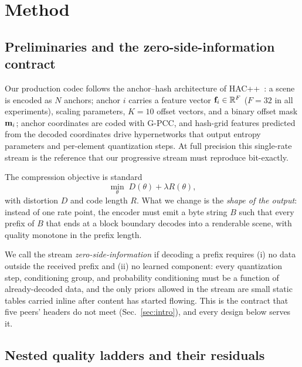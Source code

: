 \section{Method}
\label{sec:method}

\subsection{Preliminaries and the zero-side-information contract}
\label{sec:prelim}

Our production codec follows the anchor--hash architecture of HAC++~\cite{chen2025}: a scene is encoded as $N$ anchors; anchor $i$ carries a feature vector $\mathbf{f}_i\in\mathbb{R}^{F}$ ($F{=}32$ in all experiments), scaling parameters, $K{=}10$ offset vectors, and a binary offset mask $\mathbf{m}_i$; anchor coordinates are coded with G-PCC, and hash-grid features predicted from the decoded coordinates drive hypernetworks that output entropy parameters and per-element quantization steps.
At full precision this single-rate stream is the reference that our progressive stream must reproduce bit-exactly.

The compression objective is standard
\begin{equation}
\min_{\theta}\; D(\theta) + \lambda R(\theta),
\label{eq:rd}
\end{equation}
with distortion $D$ and code length $R$.
What we change is the \emph{shape of the output}: instead of one rate point, the encoder must emit a byte string $B$ such that every prefix of $B$ that ends at a block boundary decodes into a renderable scene, with quality monotone in the prefix length.

We call the stream \emph{zero-side-information} if decoding a prefix requires (i) no data outside the received prefix and (ii) no learned component: every quantization step, conditioning group, and probability conditioning must be a function of already-decoded data, and the only priors allowed in the stream are small static tables carried inline after content has started flowing.
This is the contract that five peers' headers do not meet (Sec.~\ref{sec:intro}), and every design below serves it.

\subsection{Nested quality ladders and their residuals}
\label{sec:ladder}

